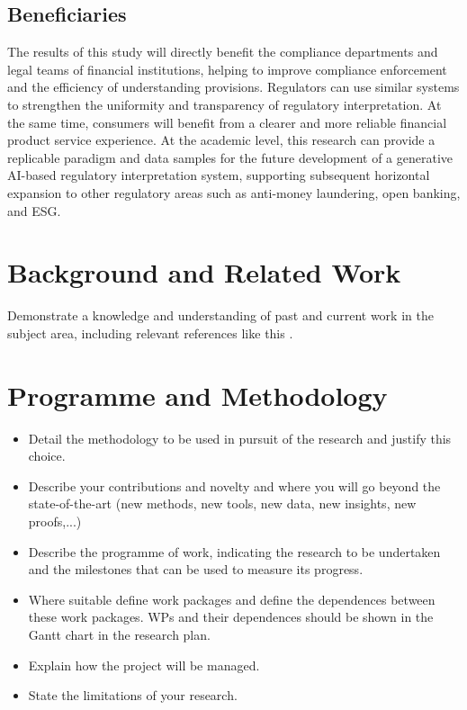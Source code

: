 \documentclass[a4paper,11pt]{article}
\begin{document}
\subsection{Beneficiaries}

The results of this study will directly benefit the compliance departments and legal teams of financial institutions, helping to improve compliance enforcement and the efficiency of understanding provisions. Regulators can use similar systems to strengthen the uniformity and transparency of regulatory interpretation. At the same time, consumers will benefit from a clearer and more reliable financial product service experience. At the academic level, this research can provide a replicable paradigm and data samples for the future development of a generative AI-based regulatory interpretation system, supporting subsequent horizontal expansion to other regulatory areas such as anti-money laundering, open banking, and ESG.

\section{Background and Related Work}

Demonstrate a knowledge and understanding of past and current work in the subject area, including relevant references like this \cite{template}.


\section{Programme and Methodology}

\begin{itemize}
    \item Detail the methodology to be used in pursuit of the research and justify this choice.
    \item Describe your contributions and novelty and where you
    will go beyond the state-of-the-art (new methods, new tools,
    new data, new insights, new proofs,...)
    \item Describe the programme of work, indicating the research to be undertaken and the milestones that can be used to measure its progress.
    \item Where suitable define work packages and define the dependences
    between these work packages. WPs and their dependences should be
    shown in the Gantt chart in the research plan.
    \item Explain how the project will be managed.
    \item State the limitations of your research.
\end{itemize}
\end{document}
